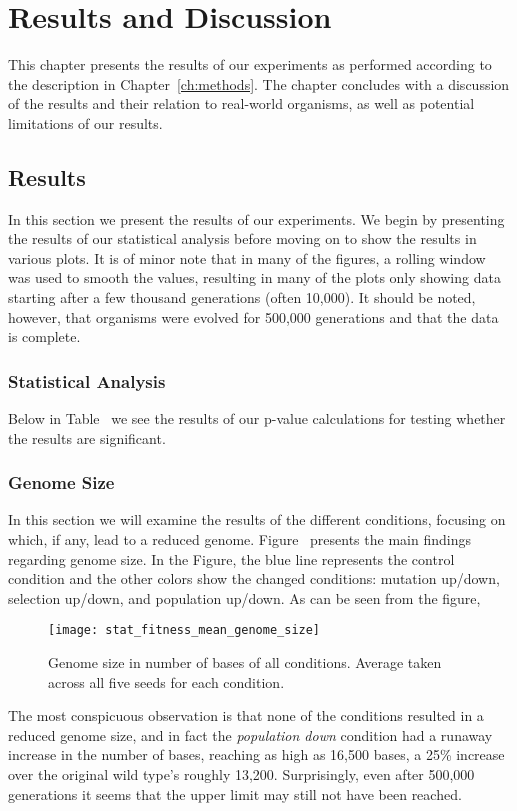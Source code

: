 \chapter{Results and Discussion}\label{ch:results_discussion}
This chapter presents the results of our experiments as performed according to the description in Chapter~\ref{ch:methods}. The chapter concludes with a discussion of the results and their relation to real-world organisms, as well as potential limitations of our results.

\section{Results}\label{results}
In this section we present the results of our experiments. We begin by presenting the results of our statistical analysis before moving on to show the results in various plots. It is of minor note that in many of the figures, a rolling window was used to smooth the values, resulting in many of the plots only showing data starting after a few thousand generations (often 10,000). It should be noted, however, that organisms were evolved for 500,000 generations and that the data is complete. 

\subsection{Statistical Analysis}
Below in Table~ we see the results of our p-value calculations for testing whether the results are significant.   

\subsection{Genome Size}
In this section we will examine the results of the different conditions, focusing on which, if any, lead to a reduced genome. Figure~%
presents the main findings regarding genome size. In the Figure, the blue line %
represents the control condition and the other colors show the changed conditions: mutation up/down, selection up/down, and population up/down. As can be seen from the figure, 
\begin{figure}[H]
	\texttt{[image: stat\_fitness\_mean\_genome\_size]}
	\centering
	\caption[Genome size]{Genome size in number of bases of all conditions. Average taken across all five seeds for each condition.}
	\label{fig:genome_size}
\end{figure}
The most conspicuous observation is that none of the conditions resulted in a reduced genome size, and in fact the \textit{population down} condition had a runaway increase in the number of bases, reaching as high as 16,500 bases, a 25\% increase over the original wild type's roughly 13,200. Surprisingly, even after 500,000 generations it seems that the upper limit may still not have been reached. 

